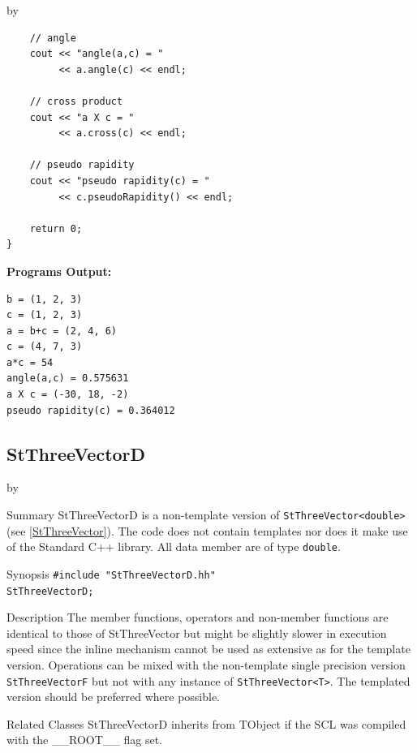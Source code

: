 \documentclass[twoside]{article}
\newcommand{\name}[1]{\textsf{#1}}%
\newcommand{\entrylabel}[1]{\mbox{\textbf{{#1}}}\hfil}%
\newenvironment{entry}
{\begin{list}{}%
    {\renewcommand{\makelabel}{\entrylabel}%
     \setlength{\labelwidth}{90pt}%
     \setlength{\leftmargin}{\labelwidth}
     \advance\leftmargin by \labelsep%
      }%
    }%
  {\end{list}}
\newcommand{\Entrylabel}[1]%
{\raisebox{0pt}[1ex][0pt]{\makebox[\labelwidth][l]%
    {\parbox[t]{\labelwidth}{\hspace{0pt}\textbf{{#1}}}}}}
\newenvironment{Entry}%
{\renewcommand{\entrylabel}{\Entrylabel}\begin{entry}}%
  {\end{entry}}
\begin{document}
\begin{description}
\begin{Entry}
{\begin{verbatim}
    // angle
    cout << "angle(a,c) = "
         << a.angle(c) << endl;

    // cross product
    cout << "a X c = "
         << a.cross(c) << endl;
    
    // pseudo rapidity
    cout << "pseudo rapidity(c) = "
         << c.pseudoRapidity() << endl;
    
    return 0;
}
\end{verbatim}

{\bf Programs Output:}

\begin{verbatim}
b = (1, 2, 3)
c = (1, 2, 3)
a = b+c = (2, 4, 6)
c = (4, 7, 3)
a*c = 54
angle(a,c) = 0.575631
a X c = (-30, 18, -2)
pseudo rapidity(c) = 0.364012
\end{verbatim}
}
\end{Entry}

\clearpage

%
%
\subsection{StThreeVectorD }
\begin{Entry}
\item[Summary]
    StThreeVectorD is a non-template version of \verb+StThreeVector<double>+
    (see \ref{StThreeVector}). The code does not contain templates nor
    does it make use of the Standard C++ library. All data member are of
    type \texttt{double}.
    
\item[Synopsis]
    \verb+#include "StThreeVectorD.hh"+ \\
    \verb+StThreeVectorD;+
    
    
\item[Description]       
    The member functions, operators and non-member functions are identical
    to those of StThreeVector but might be slightly slower in execution speed
    since the inline mechanism cannot be used as extensive as for the template
    version. Operations can be mixed with the non-template single precision version
    \texttt{StThreeVectorF} but not with any instance of \verb+StThreeVector<T>+.
    The templated version should be preferred where possible.
    
\item[Related Classes]
    StThreeVectorD inherits from TObject 
    if the SCL was compiled with the \name{\_\_ROOT\_\_} flag set.


\end{Entry}
\end{description}
\end{document}
